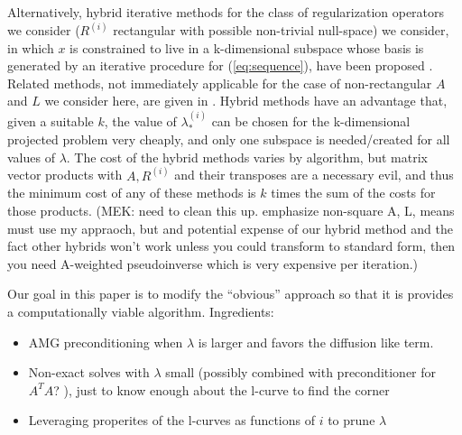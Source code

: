 Alternatively, hybrid iterative methods for the class of regularization operators we consider ($R^{(i)}$ rectangular with possible non-trivial null-space) we consider, in which $x$ is constrained to live in a k-dimensional subspace whose basis is generated by an iterative procedure for (\ref{eq:sequence}), have been proposed \cite{KilmerEspanolHansen,KilmerEtalICIAM15}.  Related methods, not immediately applicable for the case of non-rectangular $A$ and $L$ we consider here, are given in \cite{SilvaNagy15}.   Hybrid
methods have an advantage that, given a suitable $k$, the value of $\lambda_*^{(i)}$ can be chosen for the k-dimensional projected problem very cheaply, and only one subspace is needed/created for all values of $\lambda$.   The cost of the hybrid methods varies by algorithm, but matrix vector products with $A, R^{(i)}$ and their transposes are a necessary evil, and thus the minimum cost of any of these methods is $k$ times the sum of the costs for those products.   (MEK:  need to clean this up.  emphasize non-square A, L, means must use my appraoch, but and potential expense of our hybrid method and the fact other hybrids won't work unless you could transform to standard form, then you need A-weighted pseudoinverse which is very expensive per iteration.) 

Our goal in this paper is to modify the ``obvious'' approach so that it is provides a computationally viable algorithm.
Ingredients:
   \begin{itemize}
     \item AMG preconditioning when $\lambda$ is larger and favors the diffusion like term.   
     \item Non-exact solves with $\lambda$ small (possibly combined with preconditioner for $A^TA$?  ), just to know enough about the l-curve to find the corner
     \item Leveraging properites of the l-curves as functions of $i$ to prune $\lambda$
     \end{itemize} 
          

    








